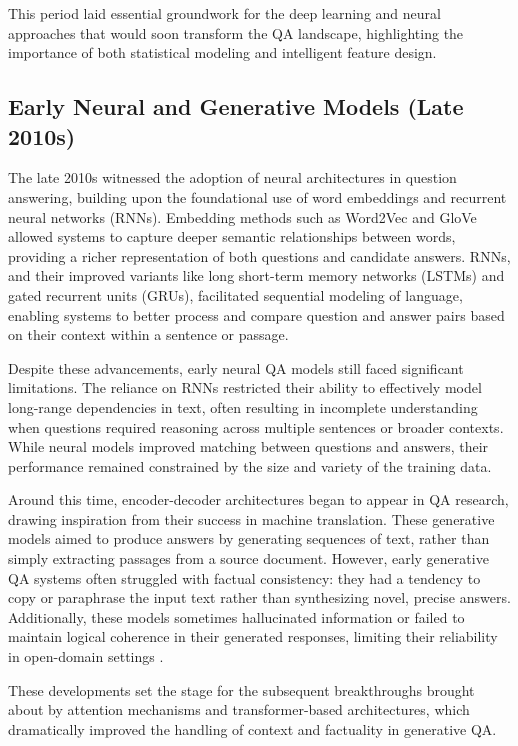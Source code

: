 \begin{spacing}{1.5}
This period laid essential groundwork for the deep learning and neural approaches that would soon transform the QA landscape, highlighting the importance of both statistical modeling and intelligent feature design.

\subsection{Early Neural and Generative Models (Late 2010s)}
The late 2010s witnessed the adoption of neural architectures in question answering, building upon the foundational use of word embeddings and recurrent neural networks (RNNs). Embedding methods such as Word2Vec and GloVe allowed systems to capture deeper semantic relationships between words, providing a richer representation of both questions and candidate answers. RNNs, and their improved variants like long short-term memory networks (LSTMs) and gated recurrent units (GRUs), facilitated sequential modeling of language, enabling systems to better process and compare question and answer pairs based on their context within a sentence or passage.

Despite these advancements, early neural QA models still faced significant limitations. The reliance on RNNs restricted their ability to effectively model long-range dependencies in text, often resulting in incomplete understanding when questions required reasoning across multiple sentences or broader contexts. While neural models improved matching between questions and answers, their performance remained constrained by the size and variety of the training data.

Around this time, encoder-decoder architectures began to appear in QA research, drawing inspiration from their success in machine translation. These generative models aimed to produce answers by generating sequences of text, rather than simply extracting passages from a source document. However, early generative QA systems often struggled with factual consistency: they had a tendency to copy or paraphrase the input text rather than synthesizing novel, precise answers. Additionally, these models sometimes hallucinated information or failed to maintain logical coherence in their generated responses, limiting their reliability in open-domain settings \citep{caballero_brief_2021}.

These developments set the stage for the subsequent breakthroughs brought about by attention mechanisms and transformer-based architectures, which dramatically improved the handling of context and factuality in generative QA.


\end{spacing}

